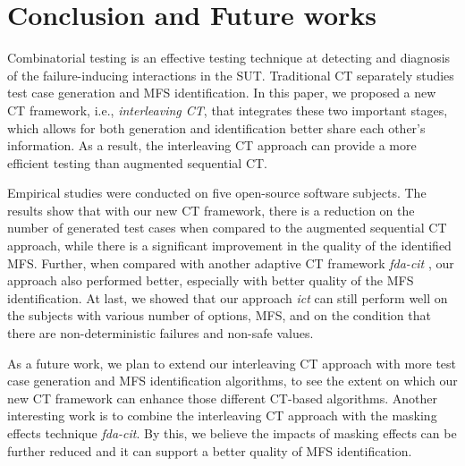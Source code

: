 \documentclass[10pt,journal,compsoc]{IEEEtran}
\begin{document}
%


\section{Conclusion and Future works}\label{sec:conclusion}
Combinatorial testing is an effective testing technique at detecting and diagnosis of the failure-inducing interactions in the SUT. Traditional CT separately studies test case generation and MFS identification. In this paper, we proposed a new CT framework, i.e., \emph{interleaving CT}, that integrates these two important stages, which allows for both generation and identification better share each other's information. As a result, the interleaving CT approach can provide a more efficient testing than augmented sequential CT.

Empirical studies were conducted on five open-source software subjects. The results show that with our new CT framework, there is a reduction on the number of generated test cases when compared to the augmented sequential CT approach, while there is a significant improvement in the quality of the identified MFS. Further, when compared with another adaptive CT framework  \emph{fda-cit} \cite{dumlu2011feedback,yilmaz2013reducing}, our approach also performed better, especially with better quality of the MFS identification. At last, we showed that our approach \emph{ict} can still perform well on the subjects with various number of options, MFS, and on the condition that there are non-deterministic failures and non-safe values.

As a future work, we plan to extend our interleaving CT approach with more test case generation and MFS identification algorithms, to see the extent on which our new CT framework can enhance those different CT-based algorithms. Another interesting work is to combine the interleaving CT approach with the masking effects technique \emph{fda-cit}\cite{yilmaz2013reducing}. By this, we believe the impacts of masking effects can be further reduced and it can support a better quality of MFS identification.





\end{document}
